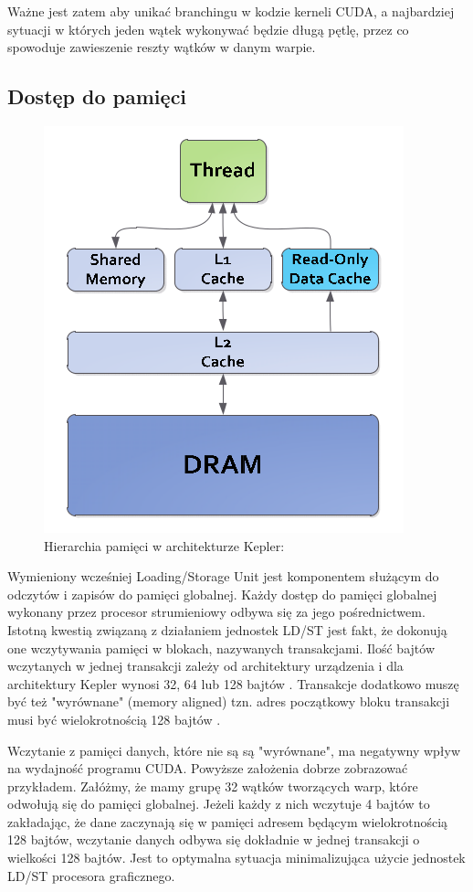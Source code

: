 Ważne jest zatem aby unikać branchingu w kodzie kerneli CUDA, a
najbardziej sytuacji w których jeden wątek wykonywać będzie długą pętlę, przez
co spowoduje zawieszenie reszty wątków w danym warpie.

\subsection{Dostęp do pamięci}

\begin{figure}[ht]
\centering
\includegraphics[scale=0.4]{images/memory-hierarchy2.png}
\caption{Hierarchia pamięci w architekturze Kepler: \cite{kepler}}
\label{hierarchiaKepler}
\end{figure}

Wymieniony wcześniej Loading/Storage Unit jest komponentem służącym do odczytów
i zapisów do pamięci globalnej. Każdy dostęp do pamięci globalnej wykonany przez
procesor strumieniowy odbywa się za jego pośrednictwem. Istotną kwestią związaną
z działaniem jednostek LD/ST jest fakt, że dokonują one wczytywania pamięci w
blokach, nazywanych transakcjami. Ilość bajtów wczytanych w jednej transakcji
zależy od architektury urządzenia i dla architektury Kepler wynosi 32, 64 lub
128 bajtów \cite{Nvi11b}. Transakcje dodatkowo muszę być też "wyrównane" (memory
		aligned) tzn. adres początkowy bloku transakcji musi być wielokrotnością
128 bajtów \cite{Nvi11b}.

Wczytanie z pamięci danych, które nie są są "wyrównane", ma negatywny wpływ na
wydajność programu CUDA.  Powyższe założenia dobrze zobrazować przykładem.
Załóżmy, że mamy grupę 32 wątków tworzących warp, które odwołują się do pamięci
globalnej. Jeżeli każdy z nich wczytuje 4 bajtów to zakładając, że dane
zaczynają się w pamięci adresem będącym wielokrotnością 128 bajtów, wczytanie
danych odbywa się dokładnie w jednej transakcji o wielkości 128 bajtów. Jest to
optymalna sytuacja minimalizująca użycie jednostek LD/ST procesora graficznego.

